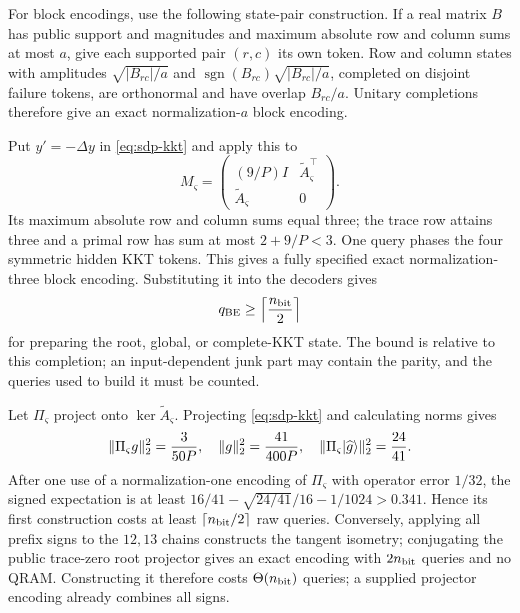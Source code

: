 For block encodings, use the following state-pair construction.  If a real
matrix $B$ has public support and magnitudes and maximum absolute row and
column sums at most $a$, give each supported pair $(r,c)$ its own token.
Row and column states with amplitudes
$\sqrt{|B_{rc}|/a}$ and
$\operatorname{sgn}(B_{rc})\sqrt{|B_{rc}|/a}$, completed on disjoint failure
tokens, are orthonormal and have overlap $B_{rc}/a$.  Unitary completions
therefore give an exact normalization-$a$ block encoding.

Put $y'=-\Delta y$ in \eqref{eq:sdp-kkt} and apply this to
\begin{equation}
 M_\varsigma=\begin{pmatrix}(9/P)I&\widetilde A_\varsigma^\top\\
                 \widetilde A_\varsigma&0\end{pmatrix}.    \label{eq:sdp-canonical-kkt}
\end{equation}
Its maximum absolute row and column sums equal three; the trace row attains
three and a primal row has sum at most $2+9/P<3$.  One query phases the
four symmetric hidden KKT tokens.  This gives a fully
specified exact normalization-three block encoding.  Substituting it into the
decoders gives
\begin{equation}
 q_{\rm BE}\geq\left\lceil\frac{n_{\rm bit}}2\right\rceil  \label{eq:sdp-kkt-call-lower}
\end{equation}
for preparing the root, global, or complete-KKT state.  The bound is
relative to this completion; an input-dependent junk part may contain the
parity, and the queries used to build it must be counted.

Let $\Pi_\varsigma$ project onto $\ker\widetilde A_\varsigma$.  Projecting
\eqref{eq:sdp-kkt} and calculating norms gives
\begin{equation}
 \lVert\Pi_\varsigma g\rVert_2^2=\frac3{50P},\quad
 \lVert g\rVert_2^2=\frac{41}{400P},\quad
 \lVert\Pi_\varsigma\lvert \widehat g\rangle\rVert_2^2=\frac{24}{41}. \label{eq:sdp-projector-signal}
\end{equation}
After one use of a normalization-one encoding of $\Pi_\varsigma$ with
operator error $1/32$, the signed expectation is at least
$16/41-\sqrt{24/41}/16-1/1024>0.341$.  Hence its first construction costs at least $\lceil n_{\rm bit}/2\rceil$ raw queries.  Conversely, applying all prefix
signs to the $12,13$ chains constructs the tangent isometry; conjugating the
public trace-zero root projector gives an exact encoding with
$2n_{\rm bit}$ queries and no QRAM.  Constructing it therefore costs
$\Theta(n_{\rm bit})$ queries; a supplied projector encoding already
combines all signs.


